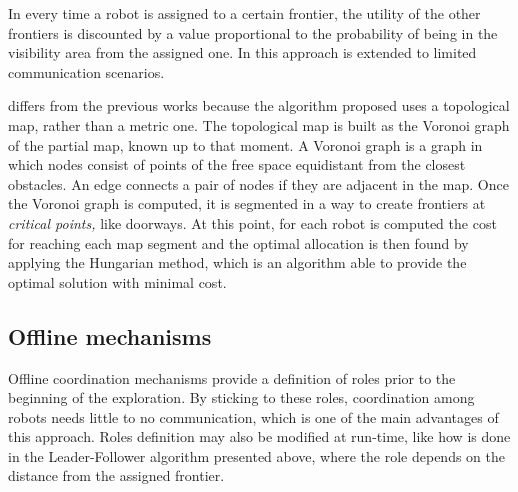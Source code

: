 In \cite{Burgard} every time a robot is assigned to a certain frontier,
the utility of the other frontiers is discounted by a value proportional
to the probability of being in the visibility area from the assigned
one. In \cite{Burgard2005} this approach is extended to limited communication
scenarios. 

\cite{Wurm2008} differs from the previous works because
the algorithm proposed uses a topological map, rather than a metric
one. The topological map is built as the Voronoi graph of the partial
map, known up to that moment. A Voronoi graph is a graph in which
nodes consist of points of the free space equidistant from the closest
obstacles. An edge connects a pair of nodes if they are adjacent in
the map. Once the Voronoi graph is computed, it is segmented in a
way to create frontiers at \emph{critical points, }like doorways.
At this point, for each robot is computed the cost for reaching each
map segment and the optimal allocation is then found by applying the
Hungarian method, which is an algorithm able to provide the optimal
solution with minimal cost. 

\subsection{Offline mechanisms}

Offline coordination mechanisms provide a definition of roles prior
to the beginning of the exploration. By sticking to these roles, coordination
among robots needs little to no communication, which is one of the
main advantages of this approach. Roles definition may also be modified
at run-time, like how is done in the Leader-Follower algorithm \cite{Wang2014}
presented above, where the role depends on the distance from the assigned
frontier. 

